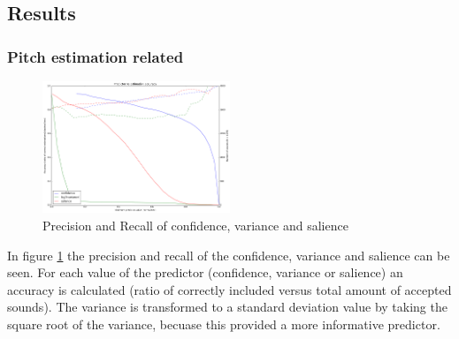 \documentclass{proc}
\begin{document}
\subsection{Results}
\subsubsection{Pitch estimation related}
\begin{figure}
    \centering
    \includegraphics[width=0.5\textwidth]{img/penr_cvs.png}
    \caption{Precision and Recall of confidence, variance and salience}
    \label{fig:penr_cvs}
\end{figure}
In figure \ref{fig:penr_cvs} the precision and recall of the confidence, variance and salience can be seen. For each value of the predictor (confidence, variance or salience) an accuracy is calculated (ratio of correctly included versus total amount of accepted sounds). The variance is transformed to a standard deviation value by taking the square root of the variance, becuase this provided a more informative predictor.
\end{document}
